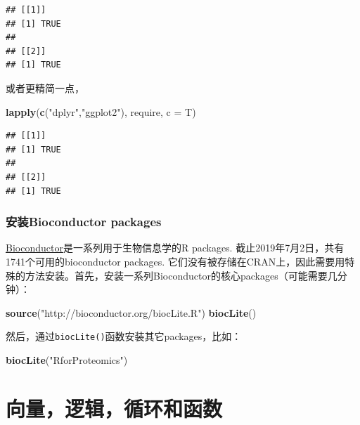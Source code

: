 \documentclass[]{book}
\newenvironment{Shaded}{\begin{snugshade}}{\end{snugshade}}
\newcommand{\DataTypeTok}[1]{\textcolor[rgb]{0.13,0.29,0.53}{#1}}
\newcommand{\KeywordTok}[1]{\textcolor[rgb]{0.13,0.29,0.53}{\textbf{#1}}}
\newcommand{\NormalTok}[1]{#1}
\newcommand{\StringTok}[1]{\textcolor[rgb]{0.31,0.60,0.02}{#1}}
\begin{document}
\begin{verbatim}
## [[1]]
## [1] TRUE
## 
## [[2]]
## [1] TRUE
\end{verbatim}

或者更精简一点，

\begin{Shaded}
\begin{Highlighting}[]
\KeywordTok{lapply}\NormalTok{(}\KeywordTok{c}\NormalTok{(}\StringTok{"dplyr"}\NormalTok{,}\StringTok{"ggplot2"}\NormalTok{), require, }\DataTypeTok{c =}\NormalTok{ T)}
\end{Highlighting}
\end{Shaded}

\begin{verbatim}
## [[1]]
## [1] TRUE
## 
## [[2]]
## [1] TRUE
\end{verbatim}

\hypertarget{Bioconductor}{%
\subsection{安装Bioconductor packages}\label{Bioconductor}}

\href{https://bioconductor.org}{Bioconductor}是一系列用于生物信息学的R packages. 截止2019年7月2日，共有1741个可用的bioconductor packages. 它们没有被存储在CRAN上，因此需要用特殊的方法安装。首先，安装一系列Bioconductor的核心packages（可能需要几分钟）：

\begin{Shaded}
\begin{Highlighting}[]
\KeywordTok{source}\NormalTok{(}\StringTok{"http://bioconductor.org/biocLite.R"}\NormalTok{)}
\KeywordTok{biocLite}\NormalTok{()}
\end{Highlighting}
\end{Shaded}

然后，通过\texttt{biocLite()}函数安装其它packages，比如：

\begin{Shaded}
\begin{Highlighting}[]
\KeywordTok{biocLite}\NormalTok{(}\StringTok{"RforProteomics"}\NormalTok{)}
\end{Highlighting}
\end{Shaded}

\hypertarget{vectors-logicals-and-functions}{%
\chapter{向量，逻辑，循环和函数}\label{vectors-logicals-and-functions}}
\end{document}
